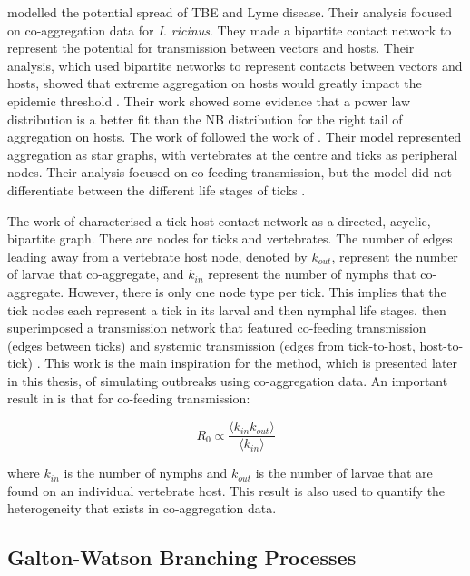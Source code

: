 \documentclass[hidelinks]{article}
\begin{document}
\citet{Bisanzio2010} modelled the potential spread of TBE and Lyme disease. Their analysis focused on co-aggregation data for \textit{I. ricinus}. They made a bipartite contact network to represent the potential for transmission between vectors and hosts. Their analysis, which used bipartite networks to represent contacts between vectors and hosts, showed that extreme aggregation on hosts would greatly impact the epidemic threshold \citep{Bisanzio2010}. Their work showed some evidence that a power law distribution is a better fit than the NB distribution for the right tail of aggregation on hosts. The work of \citet{ferreri2016} followed the work of \citet{Bisanzio2010}. Their model represented aggregation as star graphs, with vertebrates at the centre and ticks as peripheral nodes. Their analysis focused on co-feeding transmission, but the model did not differentiate between the different life stages of ticks \citep{ferreri2016}.

The work of \citet{JohnstoneRobertson2020} characterised a tick-host contact network as a directed, acyclic, bipartite graph. There are nodes for ticks and vertebrates. The number of edges leading away from a vertebrate host node, denoted by $ k_{out} $, represent the number of larvae that co-aggregate, and $ k_{in} $ represent the number of nymphs that co-aggregate. However, there is only one node type per tick. This implies that the tick nodes each represent a tick in its larval and then nymphal life stages. \citet{JohnstoneRobertson2020} then superimposed a transmission network that featured co-feeding transmission (edges between ticks) and systemic transmission (edges from tick-to-host, host-to-tick) \citep{JohnstoneRobertson2020}. This work is the main inspiration for the method, which is presented later in this thesis, of simulating outbreaks using co-aggregation data. An important result in \citet{JohnstoneRobertson2020} is that for co-feeding transmission:

\begin{equation} \label{JohnstoneRobertsonR0Estimate}
	R_0 \propto \frac{\langle k_{in}k_{out} \rangle}{\langle k_{in} \rangle } 
\end{equation}

where $ k_{in} $ is the number of nymphs and $ k_{out} $ is the number of larvae that are found on an individual vertebrate host. This result is also used to quantify the heterogeneity that exists in co-aggregation data.

\subsection{Galton-Watson Branching Processes} \label{GW_intro}
\end{document}
